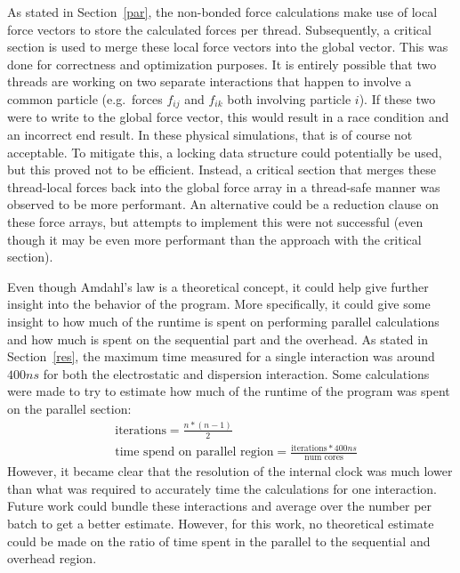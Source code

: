 \documentclass[conference]{IEEEtran}
\begin{document}
As stated in Section~\ref{par}, the non-bonded force calculations make use of local force vectors to store the
calculated forces per thread. Subsequently, a critical section is used to merge these local force vectors
into the global vector. This was done for correctness and optimization purposes. It is entirely possible that two threads
are working on two separate interactions that happen to involve a common particle (e.g.\ forces $f_{ij}$ and $f_{ik}$ both 
involving particle $i$). If these two were to write to the global force vector, this would result in a race condition
and an incorrect end result. In these physical simulations, that is of course not acceptable. To mitigate this, a
locking data structure could potentially be used, but this proved not to be efficient. Instead, a critical section
that merges these thread-local forces back into the global force array in a thread-safe manner 
was observed to be more performant. An alternative could be a reduction clause on these force arrays, but attempts to
implement this were not successful (even though it may be even more performant than the approach with the critical
section).



Even though Amdahl's law is a theoretical concept, it could help give further insight into the behavior of the
program. More specifically, it could give some insight to how much of the runtime is spent on performing
parallel calculations and how much is spent on the sequential part and the overhead.
As stated in Section~\ref{res}, the maximum time measured for a single interaction was around $400 ns$ for both
the electrostatic and dispersion interaction. Some calculations were made to try to estimate how much of the runtime
of the program was spent on the parallel section:
\begin{align*}
    &\text{iterations} = \frac{n*(n-1)}{2}\\
    &\text{time spend on parallel region} = \frac{\text{iterations}*400ns}{\text{num cores}}
\end{align*} 
However, it became clear that the resolution of the internal clock was much lower than what was required to accurately
time the calculations for one interaction. Future work could bundle these interactions and average over the number
per batch to get a better estimate. However, for this work, no theoretical estimate could be made on the ratio of
time spent in the parallel to the sequential and overhead region.
\end{document}
